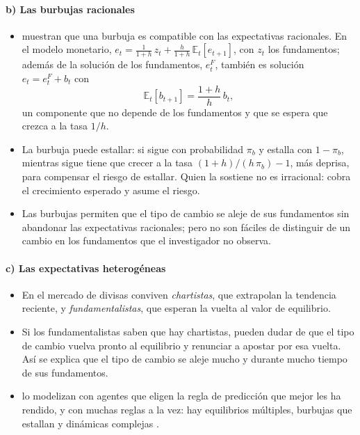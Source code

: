 \documentclass[11pt]{article}
\begin{document}
\paragraph{b) Las burbujas racionales}
\begin{itemize}
\item \textcite{BlanchardWatson1982} muestran que una burbuja es compatible con las expectativas racionales. En el modelo monetario, $e_t=\frac{1}{1+h}\,z_t+\frac{h}{1+h}\,\mathbb{E}_t[e_{t+1}]$, con $z_t$ los fundamentos; además de la solución de los fundamentos, $e^F_t$, también es solución $e_t=e^F_t+b_t$ con
  \begin{equation}\label{eq:burbuja}
  \mathbb{E}_t[b_{t+1}]=\frac{1+h}{h}\,b_t ,
  \end{equation}
  un componente que no depende de los fundamentos y que se espera que crezca a la tasa $1/h$.
\item La burbuja puede estallar: si sigue con probabilidad $\pi_b$ y estalla con $1-\pi_b$, mientras sigue tiene que crecer a la tasa $(1+h)/(h\,\pi_b)-1$, más deprisa, para compensar el riesgo de estallar. Quien la sostiene no es irracional: cobra el crecimiento esperado y asume el riesgo.
\item Las burbujas permiten que el tipo de cambio se aleje de sus fundamentos sin abandonar las expectativas racionales; pero no son fáciles de distinguir de un cambio en los fundamentos que el investigador no observa.
\end{itemize}

\paragraph{c) Las expectativas heterogéneas}
\begin{itemize}
\item En el mercado de divisas conviven \emph{chartistas}, que extrapolan la tendencia reciente, y \emph{fundamentalistas}, que esperan la vuelta al valor de equilibrio\nocite{FrankelFroot1990Chartists}.
\item Si los fundamentalistas saben que hay chartistas, pueden dudar de que el tipo de cambio vuelva pronto al equilibrio y renunciar a apostar por esa vuelta. Así se explica que el tipo de cambio se aleje mucho y durante mucho tiempo de sus fundamentos.
\item \textcite{DeGrauweGrimaldi2006} lo modelizan con agentes que eligen la regla de predicción que mejor les ha rendido, y con muchas reglas a la vez\nocite{DeGrauweRovira2006}: hay equilibrios múltiples, burbujas que estallan y dinámicas complejas .
\end{itemize}
\end{document}
